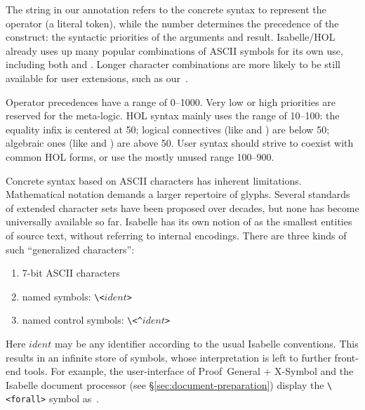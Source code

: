 \begin{isabellebody}
\begin{isamarkuptext}
  The string \isa{{\isachardoublequote}{\isacharbrackleft}{\isacharplus}{\isacharbrackright}{\isachardoublequote}} in our annotation refers to the
  concrete syntax to represent the operator (a literal token), while
  the number  determines the precedence of the construct:
  the syntactic priorities of the arguments and result.  Isabelle/HOL
  already uses up many popular combinations of ASCII symbols for its
  own use, including both \isa{{\isacharplus}} and \isa{{\isacharplus}{\isacharplus}}.  Longer
  character combinations are more likely to be still available for
  user extensions, such as our~\isa{{\isacharbrackleft}{\isacharplus}{\isacharbrackright}}.

  Operator precedences have a range of 0--1000.  Very low or high
  priorities are reserved for the meta-logic.  HOL syntax mainly uses
  the range of 10--100: the equality infix \isa{{\isacharequal}} is centered at
  50; logical connectives (like \isa{{\isasymor}} and \isa{{\isasymand}}) are
  below 50; algebraic ones (like \isa{{\isacharplus}} and \isa{{\isacharasterisk}}) are
  above 50.  User syntax should strive to coexist with common HOL
  forms, or use the mostly unused range 100--900.%
\end{isamarkuptext}%
\isamarkuptrue%
%
\isamarkuptrue%
%
\begin{isamarkuptext}%
Concrete syntax based on ASCII characters has inherent limitations.
  Mathematical notation demands a larger repertoire of glyphs.
  Several standards of extended character sets have been proposed over
  decades, but none has become universally available so far.  Isabelle
  has its own notion of  as the smallest entities of
  source text, without referring to internal encodings.  There are
  three kinds of such ``generalized characters'':

  \begin{enumerate}

  \item 7-bit ASCII characters

  \item named symbols: \verb,\,\verb,<,$ident$\verb,>,

  \item named control symbols: \verb,\,\verb,<^,$ident$\verb,>,

  \end{enumerate}

  Here $ident$ may be any identifier according to the usual Isabelle
  conventions.  This results in an infinite store of symbols, whose
  interpretation is left to further front-end tools.  For example, the
  user-interface of Proof~General + X-Symbol and the Isabelle document
  processor (see \S\ref{sec:document-preparation}) display the
  \verb,\,\verb,<forall>, symbol as~\isa{{\isasymforall}}.


\end{isamarkuptext}
\end{isabellebody}
